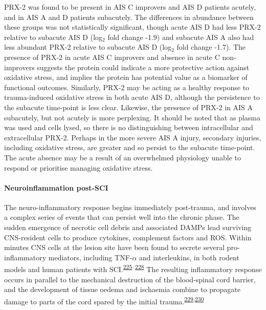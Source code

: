 \documentclass[
]{article}
\begin{document}
PRX-2 was found to be present in AIS C improvers and AIS D patients acutely, and in AIS A and D patients subacutely.
The differences in abundance between these groups was not statistically significant, though acute AIS D had less PRX-2 relative to subacute AIS D (log\(_2\) fold change -1.9) and subacute AIS A also had less abundant PRX-2 relative to subacute AIS D (log\(_2\) fold change -1.7).
The presence of PRX-2 in acute AIS C improvers and absence in acute C non-improvers suggests the protein could indicate a more protective action against oxidative stress, and implies the protein has potential value as a biomarker of functional outcomes.
Similarly, PRX-2 may be acting as a healthy response to trauma-induced oxidative stress in both acute AIS D, although the persistence to the subacute time-point is less clear.
Likewise, the presence of PRX-2 in AIS A subacutely, but not acutely is more perplexing.
It should be noted that as plasma was used and cells lysed, so there is no distinguishing between intracellular and extracellular PRX-2.
Perhaps in the more severe AIS A injury, secondary injuries, including oxidative stress, are greater and so persist to the subacute time-point.
The acute absence may be a result of an overwhelmed physiology unable to respond or prioritise managing oxidative stress.

\hypertarget{neuroinflammation-post-sci}{%
\paragraph{Neuroinflammation post-SCI}\label{neuroinflammation-post-sci}}

The neuro-inflammatory response begins immediately post-trauma, and involves a complex series of events that can persist well into the chronic phase.
The sudden emergence of necrotic cell debris and associated DAMPs lead surviving CNS-resident cells to produce cytokines, complement factors and ROS.
Within minutes CNS cells at the lesion site have been found to secrete several pro-inflammatory mediators, including TNF-\(\alpha\) and interleukins, in both rodent models and human patients with SCI.\textsuperscript{\protect\hyperlink{ref-pineau_proinflammatory_2006}{225}--\protect\hyperlink{ref-bastien_il-1_2015}{228}}
The resulting inflammatory response occurs in parallel to the mechanical destruction of the blood-spinal cord barrier, and the development of tissue oedema and ischaemia combine to propagate damage to parts of the cord spared by the initial trauma.\textsuperscript{\protect\hyperlink{ref-maikos_immediate_2007}{229},\protect\hyperlink{ref-ahuja_traumatic_2017}{230}}
\end{document}
